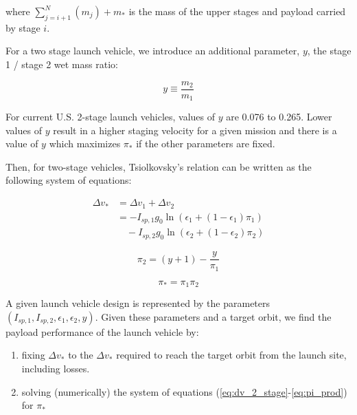 \documentclass[conf]{new-aiaa}
\begin{document}
\begin{multicols}{2}
where $\sum_{j=i+1}^N (m_j) + m_*$ is the mass of the upper stages and payload carried by stage $i$.

For a two stage launch vehicle, we introduce an additional parameter, $y$, the stage 1 / stage 2 wet mass ratio:

\begin{equation}
y \equiv \frac{m_2}{m_1}
\end{equation}

For current U.S. 2-stage launch vehicles, values of $y$ are 0.076 to 0.265. Lower values of $y$ result in a higher staging velocity for a given mission and there is a value of $y$ which maximizes $\pi_*$ if the other parameters are fixed.

Then, for two-stage vehicles, Tsiolkovsky’s relation can be written as the following system of equations:

\begin{equation}
\begin{aligned}
\label{eq:dv_2_stage}
\Delta v_* &= \Delta v_1 + \Delta v_2 \\
           &= - I_{sp,1} g_0 \ln \left( \epsilon_1 + (1 - \epsilon_1) \pi_1 \right) \\
             & \quad - I_{sp,2} g_0 \ln \left( \epsilon_2 + (1 - \epsilon_2) \pi_2 \right)
\end{aligned}
\end{equation}

\begin{equation}
\label{eq:ypi}
\pi_2 = (y + 1) - \frac{y}{\pi_1}
\end{equation}

\begin{equation}
\label{eq:pi_prod}
\pi_* = \pi_1 \pi_2
\end{equation}

A given launch vehicle design is represented by the parameters $(I_{sp,1}, I_{sp,2}, \epsilon_1, \epsilon_2, y)$. Given these parameters and a target orbit, we find the payload performance of the launch vehicle by:

\begin{enumerate}
    \item fixing $\Delta v_*$ to the $\Delta v_*$ required to reach the target orbit from the launch site, including losses.
    \item solving (numerically) the system of equations (\ref{eq:dv_2_stage}-\ref{eq:pi_prod}) for $\pi_*$
\end{enumerate}


\end{multicols}
\end{document}
